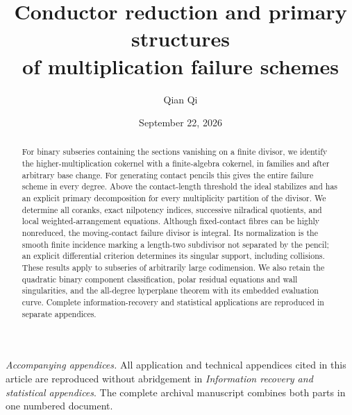 \documentclass[11pt,reqno]{amsart}
\title[Conductor reduction and multiplication failure]{Conductor reduction and primary structures\\of multiplication failure schemes}
\author{Qian Qi}
\date{September 22, 2026}
\numberwithin{equation}{section}
\theoremstyle{definition}\newtheorem{definition}[theorem]{Definition}
\theoremstyle{remark}\newtheorem{remark}[theorem]{Remark}
\begin{document}
\begin{abstract}
For binary subseries containing the sections vanishing on a finite divisor, we identify the higher-multiplication cokernel with a finite-algebra cokernel, in families and after arbitrary base change. For generating contact pencils this gives the entire failure scheme in every degree. Above the contact-length threshold the ideal stabilizes and has an explicit primary decomposition for every multiplicity partition of the divisor. We determine all coranks, exact nilpotency indices, successive nilradical quotients, and local weighted-arrangement equations. Although fixed-contact fibres can be highly nonreduced, the moving-contact failure divisor is integral. Its normalization is the smooth finite incidence marking a length-two subdivisor not separated by the pencil; an explicit differential criterion determines its singular support, including collisions. These results apply to subseries of arbitrarily large codimension. We also retain the quadratic binary component classification, polar residual equations and wall singularities, and the all-degree hyperplane theorem with its embedded evaluation curve. Complete information-recovery and statistical applications are reproduced in separate appendices.
\end{abstract}
\maketitle















\medskip
\noindent\emph{Accompanying appendices.} All application and technical
appendices cited in this article are reproduced without abridgement in
\emph{Information recovery and statistical appendices}. The complete
archival manuscript combines both parts in one numbered document.

\end{document}
